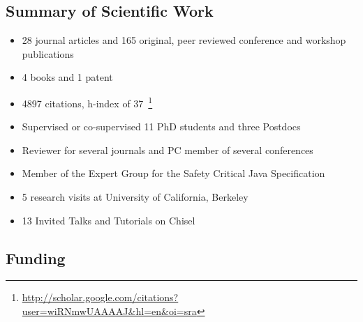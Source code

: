 \documentclass[%
    a4paper,
    11pt, %
    headinclude, footexclude,
    notitlepage,
    headsepline,
    pointlessnumbers,
    ]{scrartcl}
\begin{document}
\subsection*{Summary of Scientific Work}

\begin{itemize}
  \item 28 journal articles and 165 original, peer reviewed conference and workshop
      publications
  \item 4 books and 1 patent
  \item 4897 citations, h-index of 37~\footnote{\url{http://scholar.google.com/citations?user=wiRNmwUAAAAJ&hl=en&oi=sra}}
  \item Supervised or co-supervised 11 PhD students and three Postdocs
  \item Reviewer for several journals and PC member of several
      conferences
  \item Member of the Expert Group for the Safety Critical Java
      Specification
  \item 5 research visits at University of California, Berkeley
  \item 13 Invited Talks and Tutorials on Chisel
\end{itemize}

\subsection*{Funding}
\end{document}
